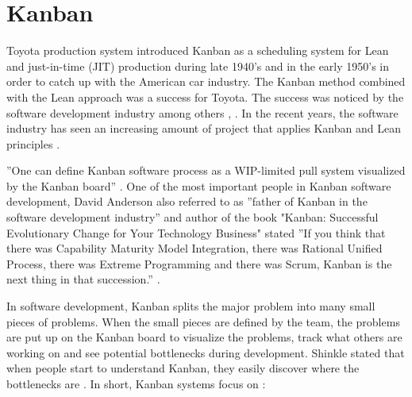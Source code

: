 \documentclass[UKenglish]{ifimaster}  %
\begin{document}
\section{Kanban}
\label{sec:Kan}

Toyota production system introduced Kanban as a scheduling system for Lean and just-in-time (JIT) production during late 1940's and in the early 1950's in order to catch up with the American car industry. The Kanban method combined with the Lean approach was a success for Toyota. The success was noticed by the software development industry among others \parencite{Conboy}, \parencite{ono1988toyota}. In the recent years, the software industry has seen an increasing amount of project that applies Kanban and Lean principles \parencite{DavidAnderson}.

''One can define Kanban software process as a WIP-limited pull system visualized by the Kanban board''  \parencite{DavidAnderson}.
One of the most important people in Kanban software development, David Anderson  also referred to as ''father of Kanban in the software development industry''  \parencite{InfoQ:2013:May:Online} and author of the book "Kanban: Successful Evolutionary Change for Your Technology Business"\parencite{0984521402} stated ''If you think that there was Capability Maturity Model Integration, there was Rational Unified Process, there was Extreme Programming and there was Scrum, Kanban is the next thing in that succession.''   \parencite{InfoQ} .

In software development, Kanban splits the major problem into many small pieces of problems. When the small pieces are defined by the team, the problems are put up on the Kanban board to visualize the problems, track what others are working on and see potential bottlenecks during development. Shinkle stated that when people start to understand Kanban, they easily discover where the bottlenecks are \parencite{Shinkle}. In short, Kanban systems focus on \parencite{DavidAnderson}:
\end{document}

